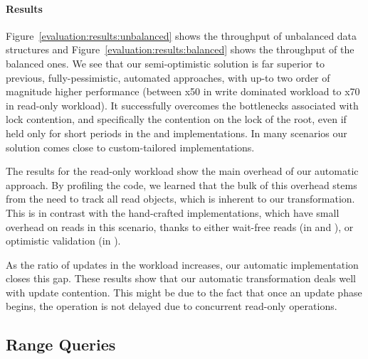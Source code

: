 \paragraph{Results}
Figure~\ref{evaluation:results:unbalanced} 
shows the throughput of unbalanced data structures and Figure~\ref{evaluation:results:balanced} shows
the throughput of the balanced ones. We see that our semi-optimistic
solution is far superior to previous, fully-pessimistic, 
automated approaches, with up-to two order of magnitude higher performance
(between x50 in write dominated workload to x70 in read-only workload). It
successfully overcomes the bottlenecks associated with lock contention, and 
specifically the contention on the lock of the root, even if held only for short
periods in the \domTree and \domTreap implementations. In
many scenarios our solution comes close to custom-tailored implementations. 

\begin{figure*}
\begin{center}

\end{center}
\caption{Throughput of unbalanced data structures.}
\label{evaluation:results:unbalanced}
\end{figure*}


\begin{figure*}
\begin{center}

\end{center}
\caption{Throughput of balanced data
structures.}
\label{evaluation:results:balanced}
\end{figure*}

The results for the read-only workload show the main overhead
of our automatic approach. By profiling the code, we learned 
that the bulk of this overhead stems from the need to track all read objects,
which is inherent to our transformation. 
This is in contrast with the hand-crafted implementations,
which have small overhead on reads in this scenario, thanks to either 
wait-free reads (in \danaTree and \danaAVL), or optimistic validation (in \bronson). 
 
As the ratio of updates in the workload increases, our automatic implementation 
closes this gap.
These results show that our automatic transformation deals well with update contention. 
This might be due to the fact that once
an update phase begins, the operation is not delayed due to concurrent 
read-only operations. 


\subsection{Range Queries}
\label{sec:range} 


